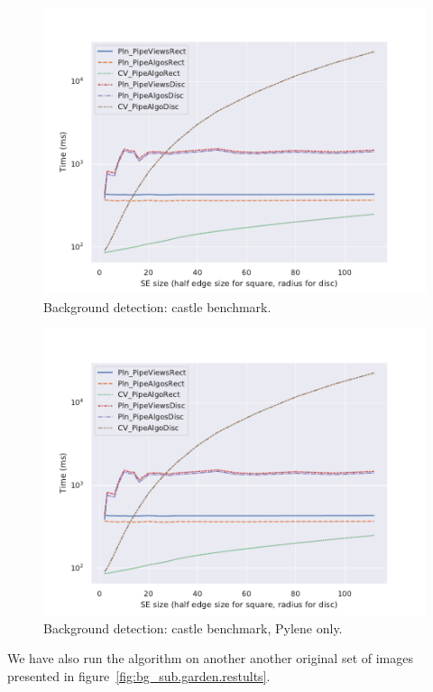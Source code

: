 \begin{figure}[tbh]
  \centering
  \includegraphics[width=.7\linewidth]{figs/bench/PlnVsOpenCV_bg_sub_0}

  \caption{Background detection: castle benchmark.}
  \label{fig:bg_sub.castle.benchmarks}
\end{figure}

\begin{figure}[tbh]
  \centering
  \includegraphics[width=.7\linewidth]{figs/bench/PlnVsOpenCV_bg_sub_0}

  \caption{Background detection: castle benchmark, Pylene only.}
  \label{fig:bg_sub.castle.benchmarks.plnonly}
\end{figure}

We have also run the algorithm on another another original set of images presented in figure~\cref{fig:bg_sub.garden.restults}.

